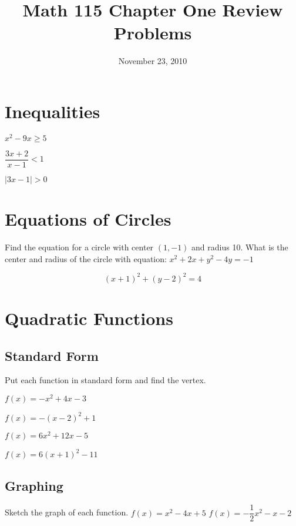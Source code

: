 \documentclass[fleqn,addpoints]{exam}
\title{Math 115 Chapter One Review Problems}
\date{November 23, 2010}
\author{}
\begin{document}
\maketitle

\begin{questions}

\section{Inequalities}

\question $x^2 - 9x \geq 5$
\begin{solution}
\end{solution}

\question $\dfrac{3x+2}{x-1} < 1$

\question $|3x-1| > 0$

\section{Equations of Circles}
\question Find the equation for a circle with center $(1, -1)$ and radius 10.
\question What is the center and radius of the circle with equation: $x^2+2x+y^2-4y=-1$

\begin{solution}
\[
  (x+1)^2 + (y-2)^2 = 4
\]

\end{solution}

\section{Quadratic Functions}

\subsection{Standard Form}
Put each function in standard form and find the vertex.

\question $f(x) = -x^2+4x-3$
\begin{solution}
  $f(x) = -(x-2)^2 + 1$
\end{solution}

\question $f(x) = 6x^2 + 12x - 5$
\begin{solution}
  $f(x) = 6(x+1)^2 - 11$
\end{solution}

\subsection{Graphing}
Sketch the graph of each function.
\question $f(x) = x^2-4x+5$
\question $f(x) = - \dfrac{1}{2} x^2 - x - 2$


\end{questions}
\end{document}
